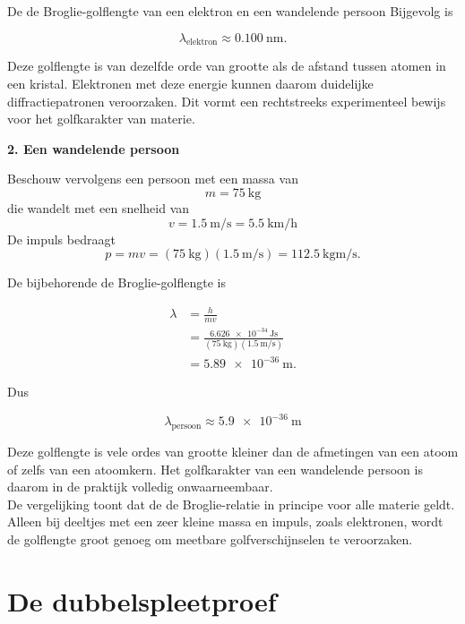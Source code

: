 \begin{voorbeeld}{De de Broglie-golflengte van een elektron en een wandelende persoon}
Bijgevolg is

\begin{equation}
\lambda_{\mathrm{elektron}} \approx \SI{0.100}{\nano\meter}.
\end{equation}

Deze golflengte is van dezelfde orde van grootte als de afstand tussen atomen in een kristal. Elektronen met deze energie kunnen daarom duidelijke diffractiepatronen veroorzaken. Dit vormt een rechtstreeks experimenteel bewijs voor het golfkarakter van materie.

\bigskip

\textbf{2. Een wandelende persoon}

Beschouw vervolgens een persoon met een massa van
\[
m=\SI{75}{\kilogram}
\]
die wandelt met een snelheid van
\[
v=\SI{1.5}{\meter\per\second} = \SI{5.5}{\km\per\hour}
\]
De impuls bedraagt
\begin{equation*}
p=mv
=
(\SI{75}{\kilogram})
(\SI{1.5}{\meter\per\second})
=
\SI{112.5}{\kilogram\meter\per\second}.
\end{equation*}

De bijbehorende de Broglie-golflengte is

\begin{align*}
\lambda
&=
\frac{h}{mv}
\\
&=
\frac{\SI{6.626e-34}{\joule\second}}
{(\SI{75}{\kilogram})(\SI{1.5}{\meter\per\second})}
\\
&=
\SI{5.89e-36}{\meter}.
\end{align*}

Dus

\begin{equation*}
\lambda_{\mathrm{persoon}}
\approx
\SI{5.9e-36}{\meter}
\end{equation*}

Deze golflengte is vele ordes van grootte kleiner dan de afmetingen van een atoom of zelfs van een atoomkern. Het golfkarakter van een wandelende persoon is daarom in de praktijk volledig onwaarneembaar.
\\

De vergelijking toont dat de de Broglie-relatie in principe voor alle materie geldt. Alleen bij deeltjes met een zeer kleine massa en impuls, zoals elektronen, wordt de golflengte groot genoeg om meetbare golfverschijnselen te veroorzaken.

\end{voorbeeld}


\section{De dubbelspleetproef}

